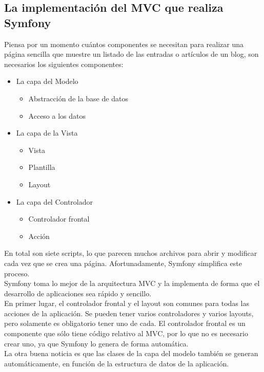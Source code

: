 \subsection{La implementación del MVC que realiza Symfony}
Piensa por un momento cuántos componentes se necesitan para realizar una página sencilla que muestre un listado de las entradas o artículos de un blog, son necesarios los siguientes componentes:
\begin{itemize}
    \item La capa del Modelo
          \begin{itemize}
              \item Abstracción de la base de datos
              \item Acceso a los datos
          \end{itemize}
    \item La capa de la Vista
          \begin{itemize}
              \item Vista
              \item Plantilla
              \item Layout
          \end{itemize}
    \item La capa del Controlador
          \begin{itemize}
              \item Controlador frontal
              \item Acción
          \end{itemize}
\end{itemize}

En total son siete scripts, lo que parecen muchos archivos para abrir y modificar cada vez que se crea una página. Afortunadamente, Symfony simplifica este proceso.\\
Symfony toma lo mejor de la arquitectura MVC y la implementa de forma que el desarrollo de aplicaciones sea rápido y sencillo.\\

En primer lugar, el controlador frontal y el layout son comunes para todas las acciones de la aplicación. Se pueden tener varios controladores y varios layouts, pero solamente es obligatorio tener uno de cada. El controlador frontal es un componente que sólo tiene código relativo al MVC, por lo que no es necesario crear uno, ya que Symfony lo genera de forma automática.\\

La otra buena noticia es que las clases de la capa del modelo también se generan automáticamente, en función de la estructura de datos de la aplicación.\\

